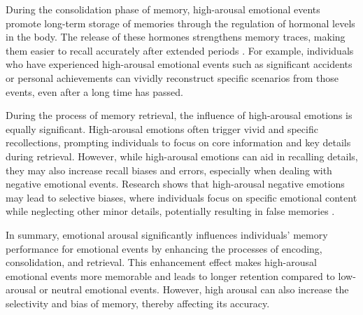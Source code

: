 During the consolidation phase of memory, high-arousal emotional events promote long-term storage of memories through the regulation of hormonal levels in the body. The release of these hormones strengthens memory traces, making them easier to recall accurately after extended periods \cite{mcgaugh2015consolidating}. For example, individuals who have experienced high-arousal emotional events such as significant accidents or personal achievements can vividly reconstruct specific scenarios from those events, even after a long time has passed. 

During the process of memory retrieval, the influence of high-arousal emotions is equally significant. High-arousal emotions often trigger vivid and specific recollections, prompting individuals to focus on core information and key details during retrieval. However, while high-arousal emotions can aid in recalling details, they may also increase recall biases and errors, especially when dealing with negative emotional events. Research shows that high-arousal negative emotions may lead to selective biases, where individuals focus on specific emotional content while neglecting other minor details, potentially resulting in false memories \cite{brainerd2008does}. 


In summary, emotional arousal significantly influences individuals' memory performance for emotional events by enhancing the processes of encoding, consolidation, and retrieval. This enhancement effect makes high-arousal emotional events more memorable and leads to longer retention compared to low-arousal or neutral emotional events. However, high arousal can also increase the selectivity and bias of memory, thereby affecting its accuracy.

